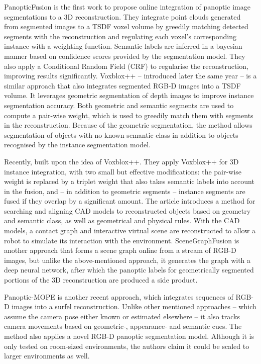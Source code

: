 PanopticFusion \cite{panopticfusion} is the first work to propose online integration of panoptic image segmentations to a 3D reconstruction. They integrate point clouds generated from segmented images to a TSDF voxel volume \cite{tsdf,voxblox} by greedily matching detected segments with the reconstruction and regulating each voxel's corresponding instance with a weighting function. Semantic labels are inferred in a bayesian manner based on confidence scores provided by the segmentation model. They also apply a Conditional Random Field (CRF) to regularise the reconstruction, improving results significantly. Voxblox++ \cite{voxblox++} -- introduced later the same year -- is a similar approach that also integrates segmented RGB-D images into a TSDF volume. It leverages geometric segmentation of depth images to improve instance segmentation accuracy. Both geometric and semantic segments are used to compute a pair-wise weight, which is used to greedily match them with segments in the reconstruction. Because of the geometric segmentation, the method allows segmentation of objects with no known semantic class in addition to objects recognised by the instance segmentation model. 

Recently, \cite{interactive_3d_scenes} built upon the idea of Voxblox++. They apply Voxblox++ for 3D instance integration, with two small but effective modifications: the pair-wise weight is replaced by a triplet weight that also takes semantic labels into account in the fusion, and -- in addition to geometric segments -- instance segments are fused if they overlap by a significant amount. The article introduces a method for searching and aligning CAD models to reconstructed objects based on geometry and semantic class, as well as geometrical and physical rules. With the CAD models, a contact graph and interactive virtual scene are reconstructed to allow a robot to simulate its interaction with the environment. SceneGraphFusion \cite{scenegraphfusion} is another approach that forms a scene graph online from a stream of RGB-D images, but unlike the above-mentioned approach, it generates the graph with a deep neural network, after which the panoptic labels for geometrically segmented portions of the 3D reconstruction are produced a side product.

Panoptic-MOPE \cite{panoptic_mope} is another recent approach, which integrates sequences of RGB-D images into a surfel reconstruction. Unlike other mentioned approaches -- which assume the camera pose either known or estimated elsewhere -- it also tracks camera movements based on geometric-, appearance- and semantic cues. The method also applies a novel RGB-D panoptic segmentation model. Although it is only tested on room-sized environments, the authors claim it could be scaled to larger environments as well.